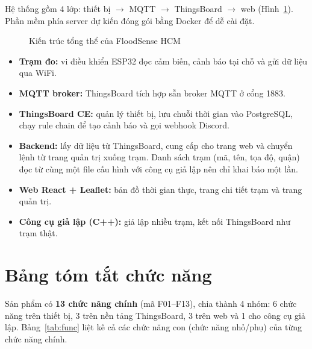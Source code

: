 \documentclass[12pt,a4paper]{article}
\begin{document}
Hệ thống gồm 4 lớp: thiết bị $\rightarrow$ MQTT $\rightarrow$ ThingsBoard $\rightarrow$ web (Hình~\ref{fig:arch}). Phần mềm phía server dự kiến đóng gói bằng Docker để dễ cài đặt.

\begin{figure}[H]
\centering
\resizebox{\linewidth}{!}{\FigArchitecture}
\caption{Kiến trúc tổng thể của FloodSense HCM}
\label{fig:arch}
\end{figure}

\begin{itemize}
  \item \textbf{Trạm đo:} vi điều khiển ESP32 đọc cảm biến, cảnh báo tại chỗ và gửi dữ liệu qua WiFi.
  \item \textbf{MQTT broker:} ThingsBoard tích hợp sẵn broker MQTT ở cổng 1883.
  \item \textbf{ThingsBoard CE:} quản lý thiết bị, lưu chuỗi thời gian vào PostgreSQL, chạy rule chain để tạo cảnh báo và gọi webhook Discord.
  \item \textbf{Backend:} lấy dữ liệu từ ThingsBoard, cung cấp cho trang web và chuyển lệnh từ trang quản trị xuống trạm. Danh sách trạm (mã, tên, tọa độ, quận) đọc từ cùng một file cấu hình với công cụ giả lập nên chỉ khai báo một lần.
  \item \textbf{Web React + Leaflet:} bản đồ thời gian thực, trang chi tiết trạm và trang quản trị.
  \item \textbf{Công cụ giả lập (C++):} giả lập nhiều trạm, kết nối ThingsBoard như trạm thật.
\end{itemize}

\section{Bảng tóm tắt chức năng}

Sản phẩm có \textbf{13 chức năng chính} (mã F01--F13), chia thành 4 nhóm: 6 chức năng trên thiết bị, 3 trên nền tảng ThingsBoard, 3 trên web và 1 cho công cụ giả lập. Bảng~\ref{tab:func} liệt kê cả các chức năng con (chức năng nhỏ/phụ) của từng chức năng chính.
\end{document}
